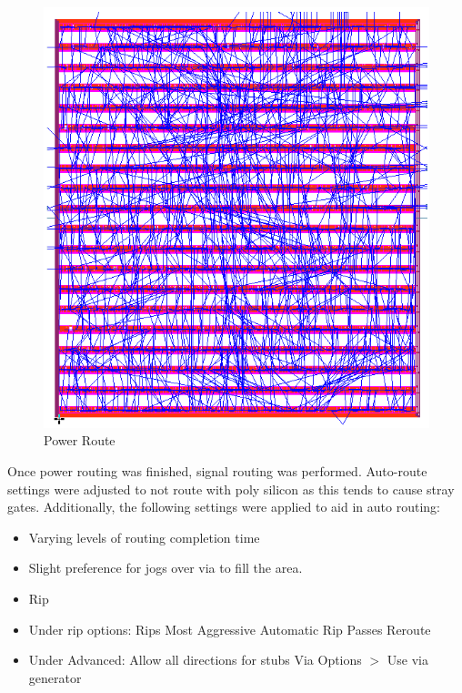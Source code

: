 \documentclass[11pt]{article}
\begin{document}
		\begin{figure}[H] 
			\centering 
			\includegraphics[width=\textwidth,height=\dimexpr\textheight-4\baselineskip-\abovecaptionskip-\belowcaptionskip\relax,keepaspectratio]{"Pictures/Power Route"}
			\caption{Power Route} 
			\label{fig:Power-Route} 
		\end{figure}
	
		Once power routing was finished, signal routing was performed. Auto-route settings were adjusted to not route with poly silicon as this tends to cause stray gates. Additionally, the following settings were applied to aid in auto routing:
		\begin{itemize}
			\item Varying levels of routing completion time
			\item Slight preference for jogs over via to fill the area.
			\item Rip
			\item Under rip options: 
			\subitem Rips Most Aggressive
			\subitem Automatic Rip Passes
			\subitem Reroute
			\item Under Advanced:
			\subitem Allow all directions for stubs
			\subitem Via Options $>$ Use via generator
		\end{itemize}
	
\end{document}
